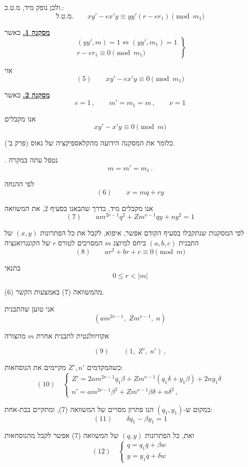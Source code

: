 \noindent ולכן נופק מיד, מ.ט.כ.:
\[ \text{מ.ט.ל.} \qquad xy' - ex'y \equiv yy'(r - er_1) \pmod{m_1} \]

\bigskip
\noindent\textbf{\underline{מסקנה 1.}} כאשר
\[ \left. \begin{array}{l} (yy', m) = 1 \Longleftrightarrow (yy', m_1) = 1 \\ r - er_1 \equiv 0 \pmod{m_1} \end{array} \right\} \]

\noindent אזי
\[ (5) \qquad xy' - ex'y \equiv 0 \pmod{m_1} \]

\bigskip
\noindent\textbf{\underline{מסקנה 2.}} כאשר
\[ e = 1 \, , \qquad m' = m_1 = m \, , \qquad \nu = 1 \]

\noindent אנו מקבלים
\[ xy' - x'y \equiv 0 \pmod{m} \]

\noindent כלומר את המסקנה הידועה מהקלאספיקציה של גאוס (פרק ב').

\medskip
{}. נטפל עתה במקרה
\[ m = m' = m_1 \, . \]

\noindent לפי ההנחה
\[ (6) \qquad x = m q + ry \]

\noindent אנו מקבלים מיד, בדרך שהבאנו בסעיף 2, את המשוואה
\[ (7) \qquad am^{2\nu-1}q^2 + Zm^{\nu-1}qy + ny^2 = 1 \]

\noindent לפי המסקנות שנתקבלו בסעיף הקודם אפשר, איפוא, לקבל את כל
הפתרונות $(x,y)$ של התבנית $(a,b,c)$ ביחס למיוצג $m$
המסויכים לטורס $r$ של הקונגרואנציה
\[ (8) \qquad ar^2 + br + c \equiv 0 \pmod{m} \]

\noindent בתנאי
\[ 0 \le r < |m| \]

\noindent מהמשוואה (7) באמצעות הקשר (6).

\noindent אני טוען שהתבנית
\[ \left(am^{2\nu-1},\; Zm^{\nu-1},\; n\right) \]

\noindent אקוויוולנטית לתבנית אחרת $m$ מהצורה

\[ (9) \qquad (1,\; Z',\; n') \, , \]

\noindent כשהמקדמים $Z', n'$ מקיימים את הנוסחאות:
\[ (10) \quad \left\{ \begin{array}{l}
Z' = 2am^{2\nu-1}q_1\beta + Zm^{\nu-1}(q_1\delta + y_1\beta) + 2ny_1\delta \\[4pt]
n' = am^{2\nu-1}\beta^2 + Zm^{\nu-1}\beta\delta + n\delta^2 \, ,
\end{array} \right. \]

\noindent במקום ש-$(q_1, y_1)$ הנו פתרון מסויים של המשוואה (7), ומתקיים
בבת-אחת:
\[ (11) \qquad \delta q_1 - \beta y_1 = 1 \]

\noindent ואת, כל הפתרונות $(q,y)$ של המשוואה (7) אפשר לקבל מהנוסחאות
\[ (12) \quad \left\{ \begin{array}{l}
q = q_1 \bar{q} + \beta w \\
y = y_1 \bar{q} + \delta w
\end{array} \right. \]

